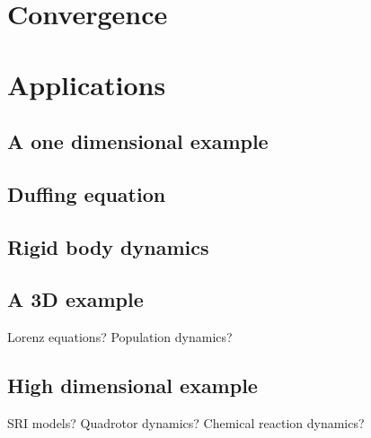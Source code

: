 \documentclass[12pt]{amsart}
\newcommand{\R}{\ensuremath{\mathbb{R}}}
\DeclareMathOperator{\Lin}{Lin}
\DeclareMathOperator{\Conj}{Conj}
\begin{document}


\section{Convergence}
\label{sec:convergence}

\section{Applications}

\subsection{A one dimensional example}

\subsection{Duffing equation}

\subsection{Rigid body dynamics}

\subsection{A 3D example}
Lorenz equations?  Population dynamics?

\subsection{High dimensional example}
SRI models?  Quadrotor dynamics?  Chemical reaction dynamics?
\end{document}

